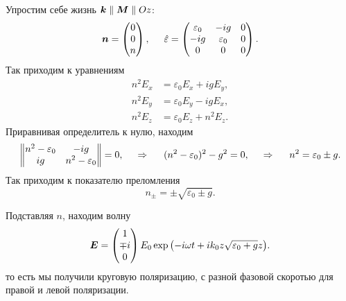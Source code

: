 Упростим себе жизнь $\mbox{\boldmath $k$} \parallel \mbox{\boldmath $M$} \parallel Oz$:
\begin{equation*}
    \mbox{\boldmath $n$} = \begin{pmatrix}
        0 \\ 0 \\ n
    \end{pmatrix},
    \hspace{5 mm} 
    \hat{\varepsilon} = \begin{pmatrix}
        \varepsilon_{0} & -ig & 0 \\
        -ig & \varepsilon_0 & 0 \\
        0 & 0 & 0 \\
    \end{pmatrix}.
\end{equation*}
Так приходим к уравнениям
\begin{align*}
    n^2 E_x &= \varepsilon_0 E_x + i g E_y, \\
    n^2 E_y &= \varepsilon_0 E_y - i g E_x, \\
    n^2 E_z &= \varepsilon_0 E_z + n^2 E_z.
\end{align*}
Приравнивая определитель к нулю, находим
\begin{equation*}
    \begin{Vmatrix}
        n^2 - \varepsilon_0 & -i g  \\
        i g & n^2 - \varepsilon_0  \\
    \end{Vmatrix} = 0,
    \hspace{0.5cm} \Rightarrow \hspace{0.5cm}
    (n^2 - \varepsilon_0)^2 - g^2 = 0,
    \hspace{0.5cm} \Rightarrow \hspace{0.5cm}
    n^2 = \varepsilon_0 \pm g.
\end{equation*}
Так приходим к показателю преломления
\begin{equation*}
    n_{\pm} = \pm \sqrt{\varepsilon_0 \pm g}.
\end{equation*}

Подставляя $n$, находим волну
\begin{equation*}
    \mbox{\boldmath $E$} = \begin{pmatrix}
        1 \\ \mp i \\ 0
    \end{pmatrix} E_0 \exp{\left(- i \omega t + i k_0 z \sqrt{\varepsilon_0 + g} z\right)}.
\end{equation*}
то есть мы получили круговую поляризацию, с разной фазовой скоротью для правой и левой поляризации.

